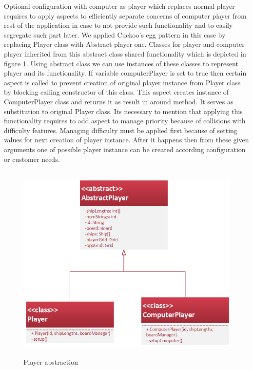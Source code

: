 \documentclass[11pt,english,a4paper,twoside]{article}
\begin{document}
Optional configuration with computer as player which replaces normal player requires to apply aspects to efficiently separate concerns of computer player from rest of the application in case to not provide such functionality and to easily segregate such part later. We applied Cuckoo's egg pattern in this case by replacing Player class with Abstract player one. Classes for player and computer player inherited from this abstract class shared functionality which is depicted in figure \ref{playerAbstraction}. Using abstract class we can use instances of these classes to represent player and its functionality. If variable computerPlayer is set to true then certain aspect is called to prevent creation of original player instance from Player class by blocking calling constructor of this class. This aspect creates instance of ComputerPlayer class and returns it as result in around method. It serves as substitution to original Player class. Its necessary to mention that applying this functionality requires to add aspect to manage priority because of collisions with difficulty features. Managing difficulty must be applied first because of setting values for next creation of player instance. After it happens then from these given arguments one of possible player instance can be created according configuration or customer needs.   

\begin{figure}[H]  %
					\begin{center}
									\includegraphics[height=10cm]{fig/playerAbstraction.png}
									\caption{Player abstraction}
									\label{playerAbstraction}
					\end{center}
\end{figure}
\end{document}
